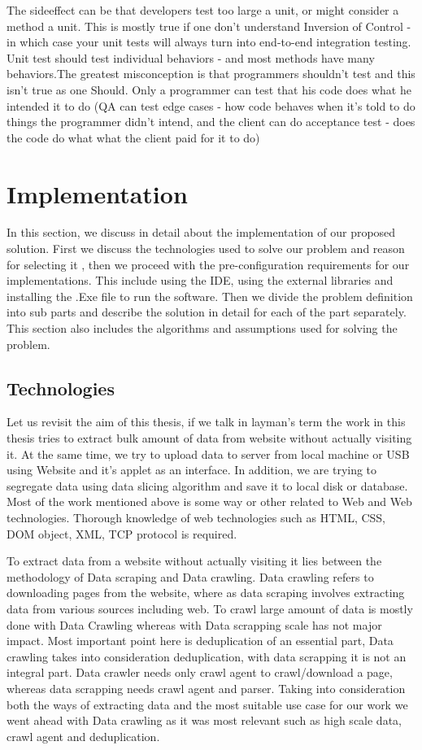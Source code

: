 \documentclass[article,type=msc,colorback,accentcolor=tud9c,twoside,11pt]{tudthesis}
\begin{document}
The sideeffect can be that developers test too large a unit, or might consider a method a unit. This is mostly true if one don't understand Inversion of Control - in which case your unit tests will always turn into end-to-end integration testing. Unit test should test individual behaviors - and most methods have many behaviors.The greatest misconception is that programmers shouldn't test and this isn't true as one Should. Only a programmer can test that his code does what he intended it to do (QA can test edge cases - how code behaves when it's told to do things the programmer didn't intend, and the client can do acceptance test - does the code do what what the client paid for it to do)


\clearpage

\section{Implementation}
In this section, we discuss in detail about the implementation of our proposed solution. First we discuss the technologies used to solve our problem and reason for selecting it , then we proceed with the pre-configuration requirements for our implementations. This include using the IDE, using the external libraries and installing the .Exe file to run the software. Then we divide the problem definition into sub parts and describe the solution in detail for each of the part separately. This section also includes the algorithms and assumptions used for solving the problem.

\subsection{Technologies}
Let us revisit the aim of this thesis, if we talk in layman's term the work in this thesis tries to extract bulk amount of data from website without actually visiting it. At the same time, we try to upload data to server from local machine or USB using Website and it's applet as an interface. In addition, we are trying to segregate data using data slicing algorithm and save it to local disk or database. Most of the work mentioned above is some way or other related to Web and Web technologies. Thorough knowledge of web technologies such as HTML, CSS, DOM object, XML, TCP protocol is required.

To extract data from a website without actually visiting it lies between the methodology of Data scraping and Data crawling. Data crawling refers to downloading pages from the website, where as data scraping involves extracting data from various sources including web. To crawl  large amount of data is mostly done with Data Crawling whereas with Data scrapping scale has not major impact. Most important point here is deduplication of an essential part, Data crawling takes into consideration deduplication, with data scrapping it is not an integral part. Data crawler needs only crawl agent to crawl/download a page, whereas data scrapping needs crawl agent and parser. Taking into consideration both the ways of extracting data and the most suitable use case for our work we went ahead with Data crawling as it was most relevant such as high scale data, crawl agent and deduplication.
\end{document}
